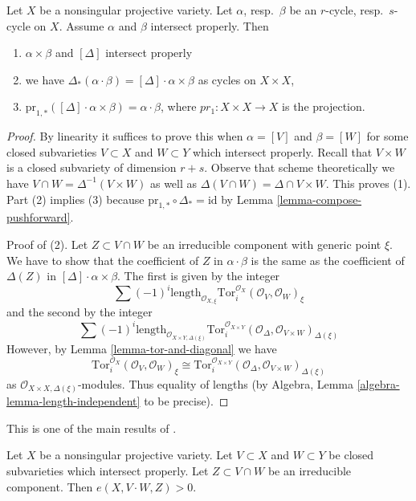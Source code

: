 \begin{lemma}
\label{lemma-reduction-diagonal}
Let $X$ be a nonsingular projective variety. Let $\alpha$, resp.\ $\beta$
be an $r$-cycle, resp.\ $s$-cycle on $X$. Assume $\alpha$ and $\beta$
intersect properly. Then
\begin{enumerate}
\item $\alpha \times \beta$ and $[\Delta]$ intersect properly
\item we have $\Delta_*(\alpha \cdot \beta) = [\Delta] \cdot \alpha\times\beta$
as cycles on $X \times X$,
\item $\text{pr}_{1, *}([\Delta] \cdot \alpha\times\beta) = \alpha\cdot\beta$,
where $pr_1 : X\times X \to X$ is the projection.
\end{enumerate}
\end{lemma}

\begin{proof}
By linearity it suffices to prove this when $\alpha = [V]$ and $\beta = [W]$
for some closed subvarieties $V \subset X$ and $W \subset Y$ which intersect
properly. Recall that $V \times W$ is a closed subvariety of dimension $r + s$.
Observe that scheme theoretically we have
$V \cap W = \Delta^{-1}(V \times W)$ as well as
$\Delta(V \cap W) = \Delta \cap V \times W$.
This proves (1). Part (2) implies (3) because
$\text{pr}_{1, *} \circ \Delta_* = \text{id}$ by
Lemma \ref{lemma-compose-pushforward}.

\medskip\noindent
Proof of (2). Let $Z \subset V \cap W$ be an irreducible component
with generic point $\xi$. We have to show that the coefficient of
$Z$ in $\alpha \cdot \beta$ is the same as the coefficient of
$\Delta(Z)$ in $[\Delta] \cdot \alpha \times \beta$. The first is given
by the integer
$$
\sum (-1)^i
\text{length}_{\mathcal{O}_{X, \xi}}
\text{Tor}_i^{\mathcal{O}_X}(\mathcal{O}_V, \mathcal{O}_W)_\xi
$$
and the second by the integer
$$
\sum (-1)^i
\text{length}_{\mathcal{O}_{X \times Y, \Delta(\xi)}}
\text{Tor}_i^{\mathcal{O}_{X \times Y}}(
\mathcal{O}_\Delta, \mathcal{O}_{V \times W})_{\Delta(\xi)}
$$
However, by Lemma \ref{lemma-tor-and-diagonal} we have
$$
\text{Tor}_i^{\mathcal{O}_X}(\mathcal{O}_V, \mathcal{O}_W)_\xi \cong
\text{Tor}_i^{\mathcal{O}_{X \times Y}}(
\mathcal{O}_\Delta, \mathcal{O}_{V \times W})_{\Delta(\xi)}
$$
as $\mathcal{O}_{X \times X, \Delta(\xi)}$-modules. Thus equality
of lengths (by Algebra, Lemma \ref{algebra-lemma-length-independent}
to be precise).
\end{proof}

\begin{proposition}
\label{proposition-positivity}
\begin{reference}
This is one of the main results of \cite{Serre_algebre_locale}.
\end{reference}
Let $X$ be a nonsingular projective variety. Let $V \subset X$ and
$W \subset Y$ be closed subvarieties which intersect properly.
Let $Z \subset V \cap W$ be an irreducible component.
Then $e(X, V \cdot W, Z) > 0$.
\end{proposition}

